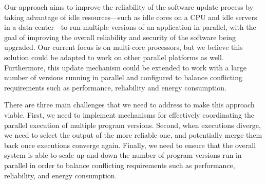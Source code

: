 Our approach aims to improve the reliability of the software update process by
taking advantage of idle resources---such as idle cores on a CPU and idle
servers in a data center---to run multiple versions of an application in
parallel, with the goal of improving the overall reliability and security of
the software being upgraded.  Our current focus is on multi-core processors,
but we believe this solution could be adapted to work on other parallel
platforms as well.  Furthermore, this update mechanism could be extended to
work with a large number of versions running in parallel and configured to
balance conflicting requirements such as performance, reliability and energy
consumption.

There are three main challenges that we need to address to make this approach
viable. First, we need to implement mechanisms for effectively coordinating the
parallel execution of multiple program versions.  Second, when executions
diverge, we need to select the output of the more reliable one, and potentially
merge them back once executions converge again.  Finally, we need to ensure
that the overall system is able to scale up and down the number of program
versions run in parallel in order to balance conflicting requirements such as
performance, reliability, and energy consumption.




